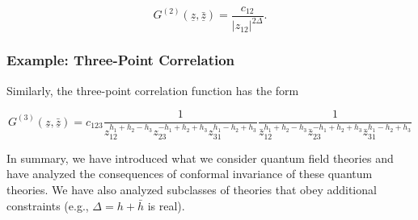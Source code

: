 \begin{equation}
G^{(2)}(\underline{z}, \underline{\bar{z}}) = \frac{c_{12}}{|z_{12}|^{2\Delta}}.
\end{equation}

\subsubsection*{Example: Three-Point Correlation}

\noindent Similarly, the three-point correlation function has the form

\begin{equation}
G^{(3)} (\underline{z}, \underline{\bar{z}}) = c_{123} \frac{1}{z_{12}^{h_1+h_2-h_3} z_{23}^{-h_1+h_2+h_3} z_{31}^{h_1-h_2+h_3}} \frac{1}{\bar{z}_{12}^{h_1+h_2-h_3} \bar{z}_{23}^{-h_1+h_2+h_3} \bar{z}_{31}^{h_1-h_2+h_3}}
\end{equation}

\noindent In summary, we have introduced what we consider quantum field theories and have analyzed the consequences of conformal invariance of these quantum theories. We have also analyzed subclasses of theories that obey additional constraints (e.g., $\Delta = h + \bar{h}$ is real).